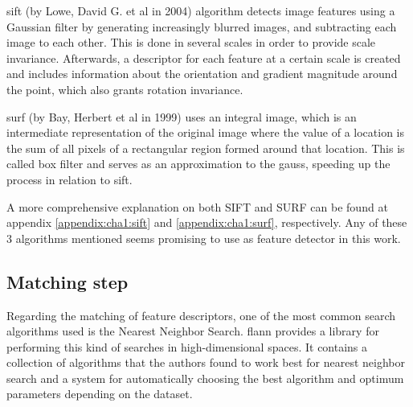 \acrshort{sift} (by Lowe, David G. et al in 2004) \cite{sift} algorithm detects image features using a Gaussian filter by generating increasingly blurred images, and subtracting each image to each other. This is done in several scales in order to provide scale invariance. Afterwards, a descriptor for each feature at a certain scale is created and includes information about the orientation and gradient magnitude around the point, which also grants rotation invariance.

\acrshort{surf} (by Bay, Herbert et al in 1999) \cite{surf} uses an integral image, which is an intermediate representation of the original image where the value of a location is the sum of all pixels of a rectangular region formed around that location. This is called box filter and serves as an approximation to the \gls{gauss}, speeding up the process in relation to \acrshort{sift}.

A more comprehensive explanation on both SIFT and SURF can be found at appendix \ref{appendix:cha1:sift} and \ref{appendix:cha1:surf}, respectively. Any of these 3 algorithms mentioned seems promising to use as feature detector in this work.

\subsection{Matching step}
Regarding the matching of feature descriptors, one of the most common search algorithms used is the Nearest Neighbor Search. \acrfull{flann}  \cite{flann} provides a library for performing this kind of searches in high-dimensional spaces. It contains a collection of algorithms that the authors found to  work best for nearest neighbor search and a system for automatically choosing the best algorithm and optimum parameters depending on the dataset.

